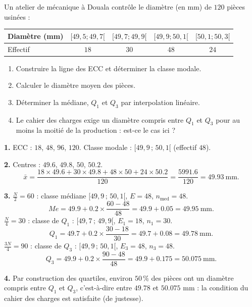 \documentclass[11pt]{article}
\begin{document}
\begin{exercice}
Un atelier de mécanique à Douala contrôle le diamètre (en mm) de $120$ pièces usinées :
\begin{center}
\begin{tabular}{|l|c|c|c|c|}
\hline
Diamètre (mm) & $[49,5;49,7[$ & $[49,7;49,9[$ & $[49,9;50,1[$ & $[50,1;50,3[$ \\
\hline Effectif & $18$ & $30$ & $48$ & $24$ \\
\hline
\end{tabular}
\end{center}
\begin{enumerate}
\item Construire la ligne des ECC et déterminer la classe modale.
\item Calculer le diamètre moyen des pièces.
\item Déterminer la médiane, $Q_1$ et $Q_3$ par interpolation linéaire.
\item Le cahier des charges exige un diamètre compris entre $Q_1$ et $Q_3$ pour au moins la moitié de la production : est-ce le cas ici ?
\end{enumerate}
\end{exercice}

\begin{corrige}
\textbf{1.} ECC : $18$, $48$, $96$, $120$. Classe modale : $[49,9\,;\,50,1[$ (effectif $48$).

\textbf{2.} Centres : $\num{49,6}$, $\num{49,8}$, $50$, $\num{50,2}$.
\[ \bar{x} = \frac{18\times \num{49,6} + 30\times \num{49,8} + 48\times 50 + 24\times \num{50,2}}{120} = \frac{\num{5991,6}}{120} = \num{49,93}\ \text{mm}. \]

\textbf{3.} $\frac{N}{2} = 60$ : classe médiane $[49,9\,;\,50,1[$, $E = 48$, $n_{\text{med}} = 48$.
\[ Me = \num{49,9} + \num{0,2}\times\frac{60-48}{48} = \num{49,9} + \num{0,05} = \num{49,95}\ \text{mm}. \]
$\frac{N}{4} = 30$ : classe de $Q_1$ : $[49,7\,;\,49,9[$, $E_1 = 18$, $n_1 = 30$.
\[ Q_1 = \num{49,7} + \num{0,2}\times\frac{30-18}{30} = \num{49,7} + \num{0,08} = \num{49,78}\ \text{mm}. \]
$\frac{3N}{4} = 90$ : classe de $Q_3$ : $[49,9\,;\,50,1[$, $E_3 = 48$, $n_3 = 48$.
\[ Q_3 = \num{49,9} + \num{0,2}\times\frac{90-48}{48} = \num{49,9} + \num{0,175} = \num{50,075}\ \text{mm}. \]

\textbf{4.} Par construction des quartiles, environ $50\,\%$ des pièces ont un diamètre compris entre $Q_1$ et $Q_3$, c'est-à-dire entre $\num{49,78}$ et $\num{50,075}$ mm : la condition du cahier des charges est satisfaite (de justesse).
\end{corrige}
\end{document}
